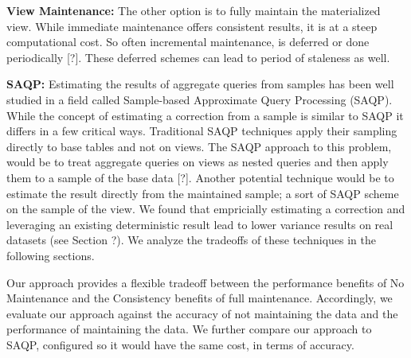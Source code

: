 \noindent\textbf{View Maintenance: }
The other option is to fully maintain the materialized view. 
While immediate maintenance offers consistent results, 
it is at a steep computational cost.
So often incremental maintenance, is deferred or done periodically [?].
These deferred schemes can lead to period of staleness as well.

\vspace{1em}

\noindent\textbf{SAQP: }
Estimating the results of aggregate queries from samples has been
well studied in a field called Sample-based Approximate Query Processing
(SAQP). While the concept of estimating a correction from a sample
is similar to SAQP it differs in a few critical ways. Traditional
SAQP techniques apply their sampling directly to base tables and not
on views. The SAQP approach to this problem, would be to treat aggregate
queries on views as nested queries and then apply them to a sample
of the base data {[}?{]}. Another potential technique would be to
estimate the result directly from the maintained sample; a sort of
SAQP scheme on the sample of the view. We found that empricially estimating
a correction and leveraging an existing deterministic result lead
to lower variance results on real datasets (see Section ?). We analyze
the tradeoffs of these techniques in the following sections.

\vspace{1em}

Our approach provides a flexible tradeoff between the performance benefits of No Maintenance and the Consistency benefits of full maintenance. Accordingly, we evaluate our approach against the accuracy of not maintaining the data and the performance of maintaining the data.
We further compare our approach to SAQP, configured so it would have the same cost, in terms of accuracy.